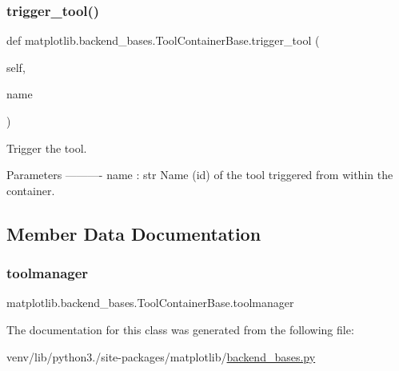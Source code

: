 \subsubsection{\texorpdfstring{trigger\+\_\+tool()}{trigger\_tool()}}
{\footnotesize\ttfamily def matplotlib.\+backend\+\_\+bases.\+Tool\+Container\+Base.\+trigger\+\_\+tool (\begin{DoxyParamCaption}\item[{}]{self,  }\item[{}]{name }\end{DoxyParamCaption})}

\begin{DoxyVerb}Trigger the tool.

Parameters
----------
name : str
    Name (id) of the tool triggered from within the container.
\end{DoxyVerb}
 

\subsection{Member Data Documentation}
\mbox{\label{classmatplotlib_1_1backend__bases_1_1ToolContainerBase_a0fe5a57383e07efb58bfe6820dd8b67b}} 
\subsubsection{\texorpdfstring{toolmanager}{toolmanager}}
{\footnotesize\ttfamily matplotlib.\+backend\+\_\+bases.\+Tool\+Container\+Base.\+toolmanager}



The documentation for this class was generated from the following file\+:\begin{DoxyCompactItemize}
\item 
venv/lib/python3./site-\/packages/matplotlib/\hyperlink{backend__bases_8py}{backend\+\_\+bases.\+py}\end{DoxyCompactItemize}
